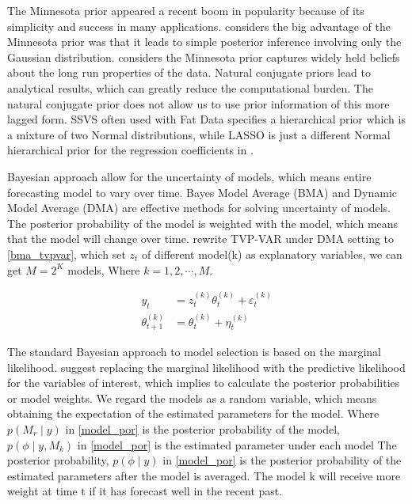 \documentclass[11pt]{article}
\begin{document}
The Minnesota prior appeared a recent boom in popularity because of its simplicity and success in many applications.
\cite{koop2010bayesian} considers the big advantage of the Minnesota prior was that 
it leads to simple posterior inference involving only the Gaussian distribution.
\cite{karlsson2013forecasting} considers the Minnesota prior captures widely held beliefs about the long run properties of the data.
Natural conjugate priors lead to analytical results, which can greatly reduce the computational burden.
The natural conjugate prior does not allow us to use prior information of this more lagged form.
SSVS often used with Fat Data specifies a hierarchical prior which is a mixture of two Normal distributions, 
while LASSO is just a different Normal hierarchical prior for the regression coefficients in \cite{koop2016bayesian}.


Bayesian approach allow for the uncertainty of models, which means entire forecasting model to vary over time.
Bayes Model Average (BMA) and Dynamic Model Average (DMA) are effective methods for solving uncertainty of models. 
The posterior probability of the model is weighted with the model, which means that the model will change over time.
\cite{koop2012forecasting} rewrite TVP-VAR under DMA setting to \eqref{bma_tvpvar}, 
which set $z_{t}$ of different model(k) as explanatory variables, we can get $ M = 2^{K} $ models, Where $ k=1,2, \cdots, M$.

\begin{equation}
	\begin{aligned}
		y_{t} &=z_{t}^{(k)} \theta_{t}^{(k)}+\varepsilon_{t}^{(k)} \\
		\theta_{t+1}^{(k)} &=\theta_{t}^{(k)}+\eta_{t}^{(k)}
	\end{aligned}
	\label{bma_tvpvar}
\end{equation}


The standard Bayesian approach to model selection is based on the marginal likelihood.
\cite{andersson2008bayesian} suggest replacing the marginal likelihood with the predictive likelihood for the variables of interest,
which implies to calculate  the posterior probabilities or model weights.
We regard the models as a random variable, which means obtaining the expectation of the estimated parameters for the model.
Where $ p\left(M_{r}\mid y\right)$ in \eqref{model_por} is the posterior probability of the model, 
$p\left(\phi \mid y, M_{k}\right)$ in \eqref{model_por}   is the estimated parameter under each model The posterior probability, 
$p(\phi\mid y)$ in \eqref{model_por}  is the posterior probability of the estimated parameters after the model is averaged.
The model k will receive more weight at time t if it has forecast well in the recent past.
\end{document}
